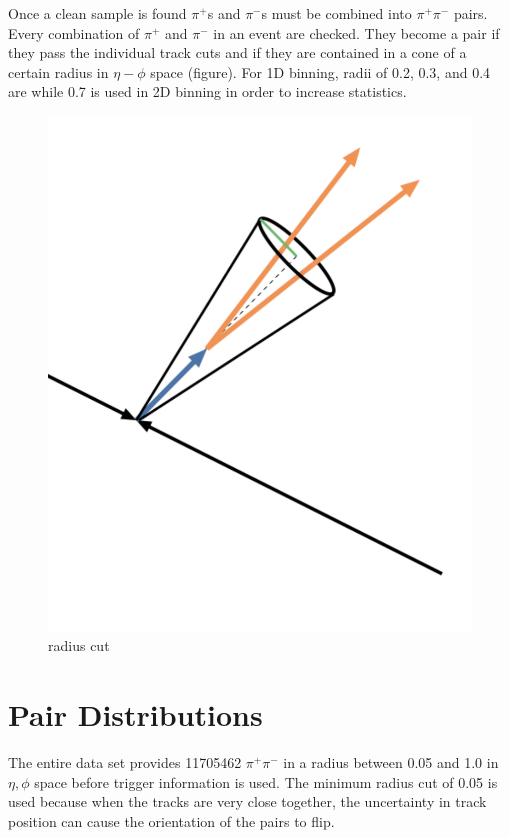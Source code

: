 \documentclass[abstract = on,listof=totoc, bibliography=totoc]{scrreprt}
\begin{document}
Once a clean sample is found $\pi^+$s and $\pi^-$s must be combined into $\pi^+\pi^-$ pairs. Every combination of $\pi^+$ and $\pi^-$ in an event are checked. They become a pair if they pass the individual track cuts and if they are contained in a cone of a certain radius in $\eta-\phi$ space (figure). For 1D binning, radii of 0.2, 0.3, and 0.4 are while 0.7 is used in 2D binning in order to increase statistics.  

\begin{figure}
\begin{center}
\includegraphics[width = 1\textwidth]{coneNew3}
\caption[Radius cut]{radius cut}
\label{fig:radCut}
\end{center}
\end{figure}

\FloatBarrier
\section{Pair Distributions}

The entire data set provides 11705462 $\pi^+\pi^-$ in a radius between 0.05 and 1.0 in $\eta,\phi$ space before trigger information is used. The minimum radius cut of 0.05 is used because when the tracks are very close together, the uncertainty in track position can cause the orientation of the pairs to flip. 
\end{document}
